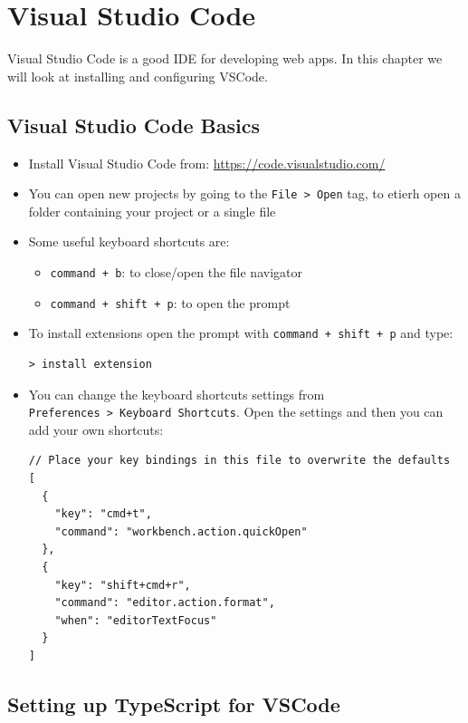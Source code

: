 \documentclass[12pt,]{article}
\providecommand{\tightlist}{%
  \setlength{\itemsep}{0pt}\setlength{\parskip}{0pt}}
\begin{document}
\section{Visual Studio Code}\label{visual-studio-code}

Visual Studio Code is a good IDE for developing web apps. In this
chapter we will look at installing and configuring VSCode.

\subsection{Visual Studio Code Basics}\label{visual-studio-code-basics}

\begin{itemize}
\item
  Install Visual Studio Code from: \url{https://code.visualstudio.com/}
\item
  You can open new projects by going to the
  \texttt{File\ \textgreater{}\ Open} tag, to etierh open a folder
  containing your project or a single file
\item
  Some useful keyboard shortcuts are:

  \begin{itemize}
  \tightlist
  \item
    \texttt{command\ +\ b}: to close/open the file navigator
  \item
    \texttt{command\ +\ shift\ +\ p}: to open the prompt
  \end{itemize}
\item
  To install extensions open the prompt with
  \texttt{command\ +\ shift\ +\ p} and type:

\begin{verbatim}
> install extension
\end{verbatim}
\item
  You can change the keyboard shortcuts settings from
  \texttt{Preferences\ \textgreater{}\ Keyboard\ Shortcuts}. Open the
  settings and then you can add your own shortcuts:

\begin{verbatim}
// Place your key bindings in this file to overwrite the defaults
[
  {
    "key": "cmd+t",
    "command": "workbench.action.quickOpen"
  },
  {
    "key": "shift+cmd+r",
    "command": "editor.action.format",
    "when": "editorTextFocus"
  }
]
\end{verbatim}
\end{itemize}

\subsection{Setting up TypeScript for
VSCode}\label{setting-up-typescript-for-vscode}
\end{document}
